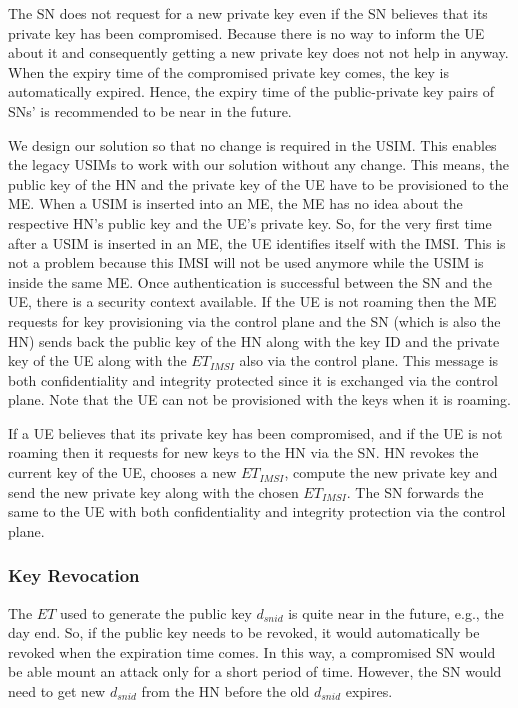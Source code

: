 \documentclass{river-journal}
\begin{document}
The SN does not request for a new private key even if the SN believes that its private key has been compromised. Because there is no way to inform the UE about it and consequently getting a new private key does not not help in anyway. When the expiry time of the compromised private key comes, the key is automatically expired. Hence, the expiry time of the public-private key pairs of SNs' is recommended to be near in the future.

We design our solution so that no change is required in the USIM. This enables the legacy USIMs to work with our solution without any change. This means, the public key of the HN and the private key of the UE have to be provisioned to the ME. When a USIM is inserted into an ME, the ME has no idea about the respective HN's public key and the UE's private key. So, for the very first time after a USIM is inserted in an ME, the UE identifies itself with the IMSI. This is not a problem because this IMSI will not be used anymore while the USIM is inside the same ME. Once authentication is successful between the SN and the UE, there is a security context available. If the UE is not roaming then the ME requests for key provisioning via the control plane and the SN (which is also the HN) sends back the public key of the HN along with the key ID and the private key of the UE along with the $ET_{IMSI}$ also via the control plane. This message is both confidentiality and integrity protected since it is exchanged via the control plane. Note that the UE can not be provisioned with the keys when it is roaming.

If a UE believes that its private key has been compromised, and if the UE is not roaming then it requests for new keys to the HN via the SN. HN revokes the current key of the UE, chooses a new $ET_{IMSI}$, compute the new private key and send the new private key along with the chosen $ET_{IMSI}$. The SN forwards the same to the UE with both confidentiality and integrity protection via the control plane.



\subsubsection{Key Revocation}
The $ET$ used to generate the public key $d_{snid}$ is quite near in the future, e.g., the day end. So, if the public key needs to be revoked, it would automatically be revoked when the expiration time comes. In this way, a compromised SN would be able mount an attack only for a short period of time. However, the SN would need to get new $d_{snid}$ from the HN before the old $d_{snid}$ expires. 
\end{document}
